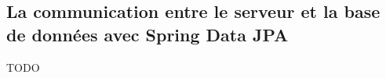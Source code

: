 \subsection{La communication entre le serveur et la base de données avec Spring Data JPA}
\label{subsec:orm-data-jpa}
TODO